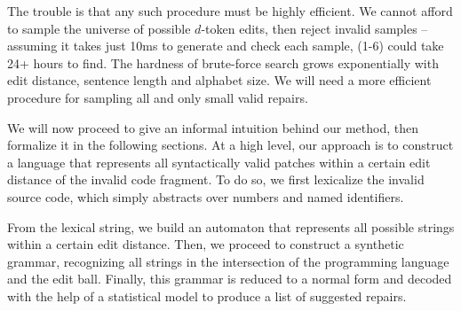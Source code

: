 \documentclass[sigplan,acmsmall,nonacm,screen]{acmart}\settopmatter{printfolios=false,printccs=false,printacmref=false}
\begin{document}
  The trouble is that any such procedure must be highly efficient. We cannot afford to sample the universe of possible $d$-token edits, then reject invalid samples -- assuming it takes just 10ms to generate and check each sample, (1-6) could take 24+ hours to find. The hardness of brute-force search grows exponentially with edit distance, sentence length and alphabet size. We will need a more efficient procedure for sampling all and only small valid repairs.

  We will now proceed to give an informal intuition behind our method, then formalize it in the following sections. At a high level, our approach is to construct a language that represents all syntactically valid patches within a certain edit distance of the invalid code fragment. To do so, we first lexicalize the invalid source code, which simply abstracts over numbers and named identifiers.

  From the lexical string, we build an automaton that represents all possible strings within a certain edit distance. Then, we proceed to construct a synthetic grammar, recognizing all strings in the intersection of the programming language and the edit ball. Finally, this grammar is reduced to a normal form and decoded with the help of a statistical model to produce a list of suggested repairs.
\end{document}
